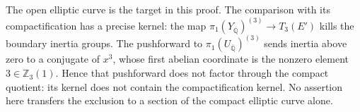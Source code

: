 The open elliptic curve is the target in this proof.
The comparison with its compactification has a
precise kernel: the map
\(\pi_1(Y_{\overline{\mathbb Q}})^{(3)}
 \to T_3(E')\) kills the boundary inertia groups.
The pushforward to \(\pi_1(U_{\overline{\mathbb Q}})^{(3)}\)
sends inertia above zero to a conjugate of \(x^3\),
whose first abelian coordinate is the nonzero element
\(3\in\mathbb Z_3(1)\). Hence that pushforward
does not factor through the compact quotient:
its kernel does not contain the compactification
kernel. No assertion here transfers the exclusion
to a section of the compact elliptic curve alone.
